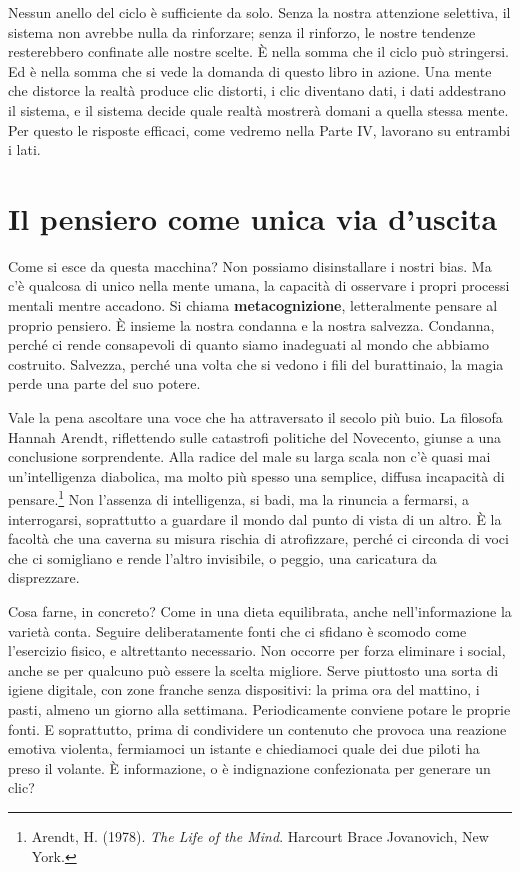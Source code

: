 Nessun anello del ciclo è sufficiente da solo. Senza la nostra attenzione selettiva, il sistema non avrebbe nulla da rinforzare; senza il rinforzo, le nostre tendenze resterebbero confinate alle nostre scelte. È nella somma che il ciclo può stringersi. Ed è nella somma che si vede la domanda di questo libro in azione. Una mente che distorce la realtà produce clic distorti, i clic diventano dati, i dati addestrano il sistema, e il sistema decide quale realtà mostrerà domani a quella stessa mente. Per questo le risposte efficaci, come vedremo nella Parte IV, lavorano su entrambi i lati.

\section{Il pensiero come unica via d'uscita}

Come si esce da questa macchina? Non possiamo disinstallare i nostri bias. Ma c'è qualcosa di unico nella mente umana, la capacità di osservare i propri processi mentali mentre accadono. Si chiama \textbf{metacognizione}, letteralmente pensare al proprio pensiero. È insieme la nostra condanna e la nostra salvezza. Condanna, perché ci rende consapevoli di quanto siamo inadeguati al mondo che abbiamo costruito. Salvezza, perché una volta che si vedono i fili del burattinaio, la magia perde una parte del suo potere.

Vale la pena ascoltare una voce che ha attraversato il secolo più buio. La filosofa Hannah Arendt, riflettendo sulle catastrofi politiche del Novecento, giunse a una conclusione sorprendente. Alla radice del male su larga scala non c'è quasi mai un'intelligenza diabolica, ma molto più spesso una semplice, diffusa incapacità di pensare.\footnote{Arendt, H. (1978). \textit{The Life of the Mind}. Harcourt Brace Jovanovich, New York.} Non l'assenza di intelligenza, si badi, ma la rinuncia a fermarsi, a interrogarsi, soprattutto a guardare il mondo dal punto di vista di un altro. È la facoltà che una caverna su misura rischia di atrofizzare, perché ci circonda di voci che ci somigliano e rende l'altro invisibile, o peggio, una caricatura da disprezzare.

Cosa farne, in concreto? Come in una dieta equilibrata, anche nell'informazione la varietà conta. Seguire deliberatamente fonti che ci sfidano è scomodo come l'esercizio fisico, e altrettanto necessario. Non occorre per forza eliminare i social, anche se per qualcuno può essere la scelta migliore. Serve piuttosto una sorta di igiene digitale, con zone franche senza dispositivi: la prima ora del mattino, i pasti, almeno un giorno alla settimana. Periodicamente conviene potare le proprie fonti. E soprattutto, prima di condividere un contenuto che provoca una reazione emotiva violenta, fermiamoci un istante e chiediamoci quale dei due piloti ha preso il volante. È informazione, o è indignazione confezionata per generare un clic?

